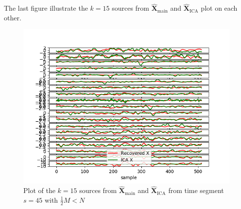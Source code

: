 The last figure illustrate the $k = 15$ sources from $\hat{\mathbf{X}}_{\text{main}}$ and $\hat{\mathbf{X}}_{\text{ICA}}$ plot on each other.
\begin{figure}[H]
    \centering
	\includegraphics[scale=0.5]{figures/ch_7/Sources_2M_N.png}
	\caption{Plot of the $k = 15$ sources from $\hat{\mathbf{X}}_{\text{main}}$ and $\hat{\mathbf{X}}_{\text{ICA}}$ from time segment $s = 45$ with $\frac{1}{2} M<N$}
	\label{fig:M<<N_3}
\end{figure} 
\noindent
